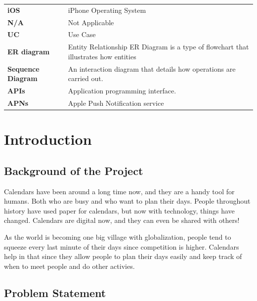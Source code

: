 \documentclass[12pt,a4paper]{report}
\begin{document}
\begin{singlespace}
\begin{center}
\begin{longtable}{p{}p{}}
    \textbf{iOS} & iPhone Operating System \\[1ex]
    
    \textbf{N/A} & Not Applicable \\[1ex]
    
    \textbf{UC} & Use Case \\[1ex]
    
    \textbf{ER diagram} & Entity Relationship ER Diagram is a type of flowchart that illustrates how entities \\[1ex]
    
    \textbf{Sequence Diagram} & An interaction diagram that details how operations are carried out. \\[1ex]
    
    \textbf{APIs} & Application programming interface. \\[1ex]
    
    \textbf{APNs} & Apple Push Notification service \\
    
    \bottomrule
    \end{longtable}
\end{center}

\end{singlespace}


\chapter{Introduction}


\section{Background of the Project}

Calendars have been around a long time now, and they are a handy tool for humans. Both who are busy and who want to plan their days. People throughout history have used paper for calendars, but now with technology, things have changed. Calendars are digital now, and they can even be shared with others!

As the world is becoming one big village with globalization, people tend to squeeze every last minute of their days since competition is higher. Calendars help in that since they allow people to plan their days easily and keep track of when to meet people and do other activies.

\section{Problem Statement}
\end{document}
